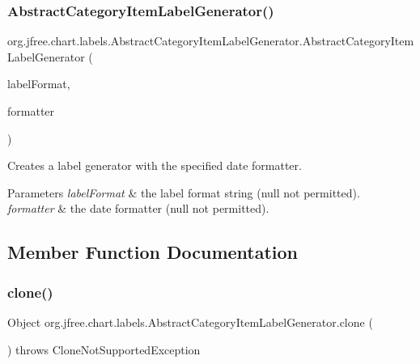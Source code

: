 \subsubsection{\texorpdfstring{Abstract\+Category\+Item\+Label\+Generator()}{AbstractCategoryItemLabelGenerator()}\hspace{0.1cm}{\footnotesize\ttfamily [3/3]}}
{\footnotesize\ttfamily org.\+jfree.\+chart.\+labels.\+Abstract\+Category\+Item\+Label\+Generator.\+Abstract\+Category\+Item\+Label\+Generator (\begin{DoxyParamCaption}\item[{String}]{label\+Format,  }\item[{Date\+Format}]{formatter }\end{DoxyParamCaption})\hspace{0.3cm}{\ttfamily [protected]}}

Creates a label generator with the specified date formatter.


\begin{DoxyParams}{Parameters}
{\em label\+Format} & the label format string ({\ttfamily null} not permitted). \\
\hline
{\em formatter} & the date formatter ({\ttfamily null} not permitted). \\
\hline
\end{DoxyParams}


\subsection{Member Function Documentation}
\mbox{\label{classorg_1_1jfree_1_1chart_1_1labels_1_1_abstract_category_item_label_generator_a8289eb2e1eddc09948d3417c1a2c84d9}} 
\subsubsection{\texorpdfstring{clone()}{clone()}}
{\footnotesize\ttfamily Object org.\+jfree.\+chart.\+labels.\+Abstract\+Category\+Item\+Label\+Generator.\+clone (\begin{DoxyParamCaption}{ }\end{DoxyParamCaption}) throws Clone\+Not\+Supported\+Exception}

